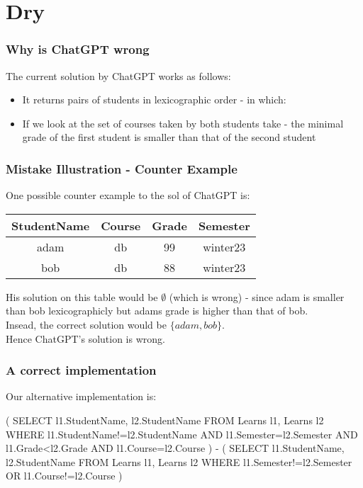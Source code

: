 \part{Dry}

\section{Why is ChatGPT wrong}
The current solution by ChatGPT works as follows:
\begin{itemize}
	\item It returns pairs of students in lexicographic order - in which:
	\item If we look at the set of courses taken by both students take -
		the minimal grade of the first student is smaller than that of the second student 
\end{itemize}

\section{Mistake Illustration - Counter Example}
One possible counter example to the sol of ChatGPT is:
\begin{center}
	\begin{tabular}{| c | c | c | c |}
		\hline
		StudentName & Course & Grade & Semester\\ 
		\hline
		adam & db & 99 & winter23\\ 
		\hline
		bob & db & 88 & winter23\\  
		\hline
	\end{tabular}
\end{center}
His solution on this table would be $\emptyset$ (which is wrong) - 
since adam is smaller than bob lexicographicly
but adams grade is higher than that of bob.\\
Insead, the correct solution would be $\{adam,bob\}$.\\
Hence ChatGPT's solution is wrong.

\section{A correct implementation}
Our alternative implementation is:
\begin{qv}
(
	SELECT l1.StudentName, l2.StudentName
	FROM Learns l1, Learns l2
	WHERE l1.StudentName!=l2.StudentName
		AND l1.Semester=l2.Semester
		AND l1.Grade<l2.Grade
		AND l1.Course=l2.Course
)
-
(
	SELECT l1.StudentName, l2.StudentName
	FROM Learns l1, Learns l2
	WHERE l1.Semester!=l2.Semester
		OR l1.Course!=l2.Course
)
\end{qv}